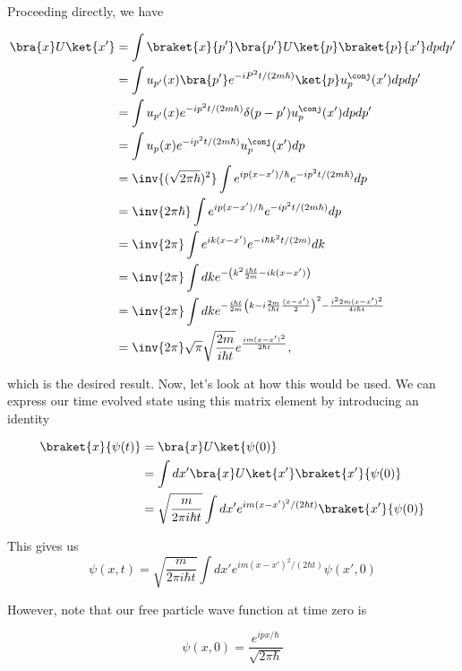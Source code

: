 Proceeding directly, we have

\begin{align*}
\bra{x} U \ket{x'}
&=
\int \braket{x}{p'} \bra{p'} U \ket{p} \braket{p}{x'} dp dp' \\
&=
\int u_{p'}(x) \bra{p'} e^{-i P^2 t/(2 m \hbar)} \ket{p} u_p^\conj(x') dp dp' \\
&=
\int u_{p'}(x) e^{-i p^2 t/(2 m \hbar)} \delta(p-p') u_p^\conj(x') dp dp' \\
&=
\int u_{p}(x) e^{-i p^2 t/(2 m \hbar)} u_p^\conj(x') dp \\
&=
\inv{(\sqrt{2 \pi \hbar})^2} \int e^{i p (x-x')/\hbar} e^{-i p^2 t/(2 m \hbar)} dp \\
&=
\inv{2 \pi \hbar} \int e^{i p (x-x')/\hbar} e^{-i p^2 t/(2 m \hbar)} dp \\
&=
\inv{2 \pi} 
\int e^{i k (x-x')} e^{-i \hbar k^2 t/(2 m)} dk \\
&=
\inv{2 \pi} 
\int dk e^{- \left(k^2 \frac{ i \hbar t}{2m} - i k (x-x')
\right)
} \\
&=
\inv{2 \pi} 
\int dk e^{- \frac{ i \hbar t}{2m}\left(k - i \frac{2m}{i \hbar t}\frac{(x-x')}{2} \right)^2
- \frac{i^2 2 m (x-x')^2}{4 i \hbar t} 
} \\
&=
\inv{2 \pi}  \sqrt{\pi} \sqrt{\frac{2m}{i \hbar t}}
e^{\frac{ i m (x-x')^2}{2 \hbar t}},
\end{align*}

which is the desired result.  Now, let's look at how this would be used.  We can express our time evolved state using this matrix element by introducing an identity

\begin{align*}
\braket{x}{\psi(t)} 
&=
\bra{x} U \ket{\psi(0)} \\
&=
\int dx' \bra{x} U \ket{x'} \braket{x'}{\psi(0)} \\
&=
\sqrt{\frac{m}{2 \pi i \hbar t}} 
\int dx' 
e^{i m (x-x')^2/ (2 \hbar t)}
\braket{x'}{\psi(0)} \\
\end{align*}

This gives us
\begin{equation}\label{eqn:qmIexamPractice2007Dec:1f:40}
\psi(x, t)
=
\sqrt{\frac{m}{2 \pi i \hbar t}} 
\int dx' 
e^{i m (x-x')^2/ (2 \hbar t)} \psi(x', 0)
\end{equation}

However, note that our free particle wave function at time zero is

\begin{equation}\label{eqn:qmIexamPractice2007Dec:1f:50}
\psi(x, 0) = \frac{e^{i p x/\hbar}}{\sqrt{2 \pi \hbar}}
\end{equation}

